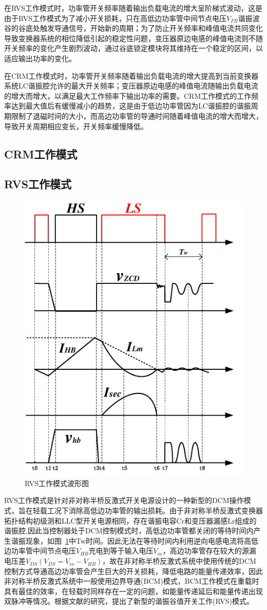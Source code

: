 在RVS工作模式时，功率管开关频率随着输出负载电流的增大呈阶梯式波动，这是由于RVS工作模式为了减小开关损耗，只在高低边功率管中间节点电压$V_{FB}$谐振波谷的谷底处触发导通信号，开始新的周期；为了防止开关频率和峰值电流共同变化导致变换器系统的相位降低引起的稳定性问题，变压器原边电感的峰值电流则不随开关频率的变化产生剧烈波动，通过谷底锁定模块将其维持在一个稳定的区间，以适应输出功率的变化。

在CRM工作模式时，功率管开关频率随着输出负载电流的增大提高到当前变换器系统LC谐振腔允许的最大开关频率；变压器原边电感的峰值电流随输出负载电流的增大而增大，以满足最大工作频率下输出功率的需要。CRM工作模式的工作频率达到最大值后有缓慢减小的趋势，这是由于低边功率管因为LC谐振腔的谐振周期限制了退磁时间的大小，而高边功率管的导通时间随着峰值电流的增大而增大，导致开关周期相应变长，开关频率缓慢降低。

\subsection{CRM工作模式}

\subsection{RVS工作模式}

\begin{figure}[htbp] 
    \centering
    \includegraphics[width=0.6\linewidth]{figures/RVS波形图.pdf}
    \caption{RVS工作模式波形图}
    \label{fig:RVS波形图}
\end{figure}

RVS工作模式是针对非对称半桥反激式开关电源设计的一种新型的DCM操作模式，旨在轻载工况下消除高低边功率管的输出损耗。由于非对称半桥反激式变换器拓扑结构初级测和LLC型开关电源相同，存在谐振电容Cr和变压器漏感Lr组成的谐振腔,因此当控制器处于DCM控制模式时，高低边功率管都关闭的等待时间内产生谐振现象，如图~\ref{fig:RVS波形图}中Tw时间。因此无法在等待时间内利用逆向电感电流将高低边功率管中间节点电压$V_{HB}$充电到等于输入电压$V_{in}$，高边功率管存在较大的源漏电压差$V_{DS}(V_{DS}=V_{in}-V_{HB})$，故在非对称半桥反激式系统中使用传统的DCM控制方式导通高边功率管会产生巨大的开关损耗，降低电路的能量传递效率，因此非对称半桥反激式系统中一般使用边界导通(BCM)模式，BCM工作模式在重载时具有最佳的效率，在轻载时同样存在一定的问题，如能量传递延后和能量传递出现双脉冲等情况。根据文献的研究，提出了新型的谐振谷值开关工作(RVS)模式。

